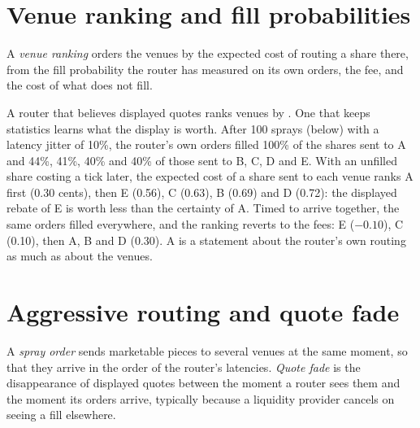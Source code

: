 \section{Venue ranking and fill probabilities}

\begin{definition}\label{def:mx:smart-order-routing:ranking}
A \emph{venue ranking} orders the venues by the expected cost of routing a share there, from the fill probability the router has
measured on its own orders, the fee, and the cost of what does not fill.
\end{definition}

A router that believes displayed quotes ranks venues by . One that keeps statistics learns what the display is worth. After 100
sprays (below) with a latency jitter of 10\%, the router's own orders filled 100\% of the shares sent to A and 44\%, 41\%, 40\% and 40\% of those sent
to B, C, D and E. With an unfilled share costing a tick later, the expected cost of a share sent to each venue ranks A first (0.30 cents), then E (0.56),
C (0.63), B (0.69) and D (0.72): the displayed rebate of E is worth less than the certainty of A. Timed to arrive together, the same orders filled
everywhere, and the ranking reverts to the fees: E ($-0.10$), C (0.10), then A, B and D (0.30). A  is a statement about the router's
own routing as much as about the venues.

\label{lst:mx:smart-order-routing:router}

\section{Aggressive routing and quote fade}

\begin{definition}\label{def:mx:smart-order-routing:spray}
A \emph{spray order} sends marketable pieces to several venues at the same moment, so that they arrive in the order of the router's
latencies. \emph{Quote fade} is the disappearance of displayed quotes between the moment a router sees them and the moment its
orders arrive, typically because a liquidity provider cancels on seeing a fill elsewhere.
\end{definition}

